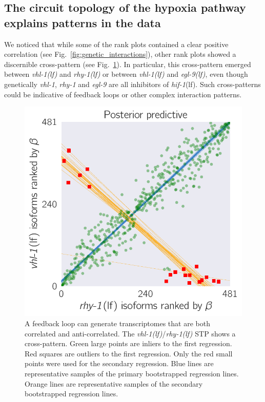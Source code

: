 \documentclass[9pt,twocolumn,twoside]{pnas-new}
\newcommand{\gene}[1]{\emph{#1}}
\newcommand{\egl}{\emph{\mbox{egl-9}(lf)}}
\newcommand{\rhy}{\emph{\mbox{rhy-1}(lf)}}
\newcommand{\vhl}{\emph{\mbox{vhl-1}(lf)}}
\newcommand{\hif}{\emph{\mbox{hif-1}}(lf)}
\begin{document}
\subsection*{The circuit topology of the hypoxia pathway explains patterns in
            the data}
\label{sub:topology}
We noticed that while some of the rank plots contained a clear positive correlation
(see Fig.~\ref{fig:genetic_interactions}), other rank plots showed
a discernible cross-pattern (see Fig.~\ref{fig:xpattern}). In particular, this
cross-pattern emerged between \vhl{} and \rhy{} or between \vhl{} and \egl{},
even though genetically \gene{vhl-1}, \gene{rhy-1} and \gene{egl-9} are all
inhibitors of \hif{}. Such cross-patterns could be indicative of feedback loops
or other complex interaction patterns.

\begin{figure}[tbhp]
\centering
\includegraphics[width=\linewidth]{figs/multiplemodes-ed.pdf}
\caption{
A feedback loop can generate transcriptomes that are both
correlated and anti-correlated. The \vhl{}/\rhy{} STP shows a cross-pattern.
Green large points are inliers to the first
regression. Red squares are outliers to the first regression. Only the red
small points were used for the secondary regression. Blue lines are representative
samples of the primary bootstrapped regression lines. Orange lines are
representative samples of the secondary bootstrapped regression lines.
}
\label{fig:xpattern}
\end{figure}
\end{document}
